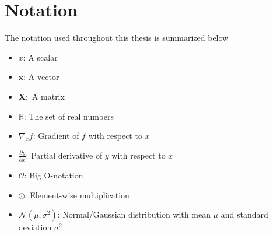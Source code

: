 \documentclass[./main.tex]{subfiles}
\begin{document}
\section{Notation}
The notation used throughout this thesis is summarized below

\begin{itemize}
    \item $x$: A scalar
    \item $\bm{x}$: A vector
    \item $\bm{X}:$ A matrix
    \item $\mathbb{R}$: The set of real numbers
    \item $\nabla_x f$: Gradient of $f$ with respect to $x$
    \item $\frac{\partial y}{\partial x}$: Partial derivative of $y$ with respect to $x$
    \item $\mathcal{O}$: Big O-notation
    \item $\odot$: Element-wise multiplication
    \item $\mathcal{N} \left(\mu, \sigma^2 \right)$: Normal/Gaussian distribution with mean $\mu$ and standard deviation $\sigma^2$
\end{itemize}
\end{document}
